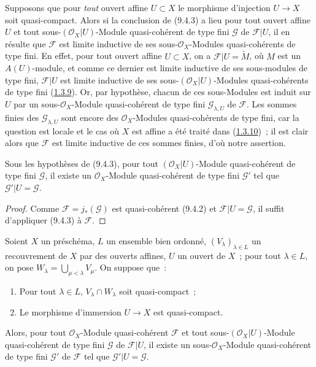 \begin{remark}[9.4.4]
\label{I.9.4.4-fr}
Supposons que pour \emph{tout} ouvert affine $U\subset X$ le morphisme
d'injection $U\to X$ soit quasi-compact. Alors si la conclusion de (9.4.3) a
lieu pour tout ouvert affine $U$ et tout sous-$(\mathscr{O}_X|U)$-Module
quasi-cohérent de type fini $\mathscr{G}$ de $\mathscr{F}|U$,
il en résulte que $\mathscr{F}$ est limite inductive de ses
sous-$\mathscr{O}_X$-Modules quasi-cohérents de type fini. En effet, pour
tout ouvert affine $U\subset X$, on a $\mathscr{F}|U=\widetilde{M}$, où $M$
est un $A(U)$-module, et comme ce dernier est limite inductive de ses
sous-modules de type fini, $\mathscr{F}|U$ est limite inductive de ses
sous-$(\mathscr{O}_X|U)$-Modules quasi-cohérents de type fini
(\hyperref[I.1.3.9-fr]{1.3.9}). Or, par hypothèse, chacun de ces sous-Modules
est induit sur $U$ par un sous-$\mathscr{O}_X$-Module quasi-cohérent de type
fini $\mathscr{G}_{\lambda,U}$ de $\mathscr{F}$. Les sommes finies des
$\mathscr{G}_{\lambda,U}$ sont encore des $\mathscr{O}_X$-Modules
quasi-cohérents de type fini, car la question est locale et le cas où $X$
est affine a été traité dans (\hyperref[I.1.3.10-fr]{1.3.10})~; il est clair
alors que $\mathscr{F}$ est limite inductive de ces sommes finies, d'où notre
assertion.
\end{remark}

\begin{corollary}[9.4.5]
\label{I.9.4.5-fr}
Sous les hypothèses de (9.4.3), pour tout $(\mathscr{O}_X|U)$-Module
quasi-cohérent de type fini $\mathscr{G}$, il existe un
$\mathscr{O}_X$-Module quasi-cohérent de type fini $\mathscr{G}'$ tel que
$\mathscr{G}'|U=\mathscr{G}$.
\end{corollary}

\begin{proof}
Comme $\mathscr{F}=j_*(\mathscr{G})$ est quasi-cohérent (9.4.2) et
$\mathscr{F}|U=\mathscr{G}$, il suffit d'appliquer (9.4.3) à $\mathscr{F}$.
\end{proof}

\begin{lemma}[9.4.6]
\label{I.9.4.6-fr}
Soient $X$ un préschéma, $L$ un ensemble bien ordonné,
$(V_\lambda)_{\lambda\in L}$ un recouvrement de $X$ par des ouverts affines,
$U$ un ouvert de $X$~; pour tout $\lambda\in L$, on pose
$W_\lambda=\bigcup_{\mu<\lambda}V_\mu$. On suppose que~:
\begin{enumerate}
  \item[\textup{1\textsuperscript{o}}] Pour tout $\lambda\in L$,
    $V_\lambda\cap W_\lambda$ soit quasi-compact~;
  \item[\textup{2\textsuperscript{o}}] Le morphisme d'immersion $U\to X$ est
    quasi-compact.
\end{enumerate}
Alors, pour tout $\mathscr{O}_X$-Module quasi-cohérent $\mathscr{F}$ et tout
sous-$(\mathscr{O}_X|U)$-Module quasi-cohérent \textup{de type fini} $\mathscr{G}$ de
$\mathscr{F}|U$, il existe un sous-$\mathscr{O}_X$-Module quasi-cohérent \textup{de
type fini} $\mathscr{G}'$ de $\mathscr{F}$ tel que
$\mathscr{G}'|U=\mathscr{G}$.
\end{lemma}

